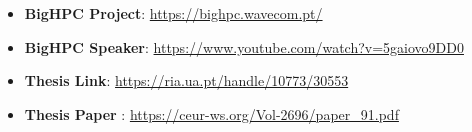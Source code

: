 \documentclass[10pt,a4paper,ragged2e,withhyper]{altacv}
\begin{document}
\begin{paracol}{2}

      \begin{itemize}
            \item \textbf{BigHPC Project}: \url{https://bighpc.wavecom.pt/}
            \item \textbf{BigHPC Speaker}: \url{https://www.youtube.com/watch?v=5gaiovo9DD0}
            \item \textbf{Thesis Link}: \url{https://ria.ua.pt/handle/10773/30553}
            \item \textbf{Thesis Paper }: \url{https://ceur-ws.org/Vol-2696/paper_91.pdf}
      \end{itemize}

      \switchcolumn

       \\ \smallbreak

\end{paracol}
\end{document}
